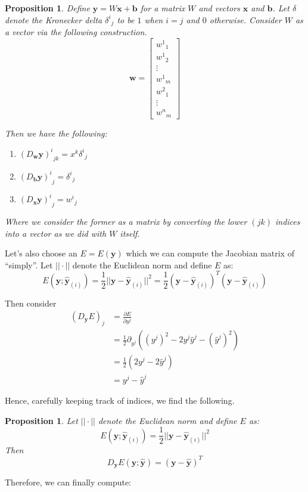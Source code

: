 \documentclass[a4paper]{article}
\theoremstyle{plain} %
\newtheorem{proposition}[theorem]{Proposition}
\theoremstyle{definition} %
\numberwithin{equation}{subsection}
\newcommand{\del}[2]{\frac{\partial #1}{\partial #2}}
\newcommand{\vx}{{\textbf{x}}}
\newcommand{\vy}{{\textbf{y}}}
\newcommand{\vw}{{\textbf{w}}}
\newcommand{\vb}{{\textbf{b}}}
\newcommand{\vyh}{{\widehat{\textbf{y}}}}
\begin{document}
\begin{proposition}\label{prop:jacobian-linear-comb}
  Define $\vy = W \vx + \vb$ for a matrix $W$ and vectors $\vx$ and $\vb$. 
  Let $\delta$ denote the \emph{Kronecker delta} ${\delta^i}_j$ to be $1$ when $i=j$ and $0$ otherwise. 
  Consider $W$ as a vector via the following construction.
  \[ \vw =\begin{bmatrix}
  {w^1}_1 \\
  {w^1}_2 \\
  \vdots \\
  {w^1}_m \\
  {w^2}_1 \\
  \vdots \\
  {w^n}_m
\end{bmatrix} \]

Then we have the following:
  \begin{enumerate}
    \item ${(D_\vw \vy)^i}_{jk} =x^k {\delta^i}_j$
    \item ${(D_\vb \vy)^i}_j = {\delta^i}_j $
    \item ${(D_\vx \vy)^i}_j = {w^i}_j $
  \end{enumerate}
Where we consider the former as a matrix by converting the lower $(jk)$ indices into a vector as we did with $W$ itself.
\end{proposition}

Let's also choose an $E = E(\vy)$ which we can compute the Jacobian matrix of ``simply''. 
Let $|| \cdot ||$ denote the Euclidean norm and define $E$ as:
\[ E(\vy; \vyh_{(i)}) = \frac{1}{2} ||\vy - \vyh_{(i)} ||^2 = \frac{1}{2} (\vy - \vyh_{(i)})^T(\vy - \vyh_{(i)}) \]

Then consider 
\begin{align*}
  (D_\vy E)_j &= \del{E}{y^j} \\
   &= \frac{1}{2} \partial_{y^j} \left((y^j)^2 - 2 y^j \widehat{y}^j - (\widehat{y}^j)^2 \right) \tag{no sum over $j$} \\
   &= \frac{1}{2} (2y^j - 2 \widehat{y}^j) \\
   &= y^j - \widehat{y}^j
  \end{align*}

Hence, carefully keeping track of indices, we find the following.

\begin{proposition} \label{prop:jacobian-square-error}
Let $|| \cdot ||$ denote the Euclidean norm and define $E$ as:
\[ E(\vy; \vyh_{(i)}) = \frac{1}{2} ||\vy - \vyh_{(i)} ||^2\]
Then 
\[ D_\vy E(\vy; \vyh) = (\vy - \vyh )^T\]
  
\end{proposition}
Therefore, we can finally compute:
\end{document}
